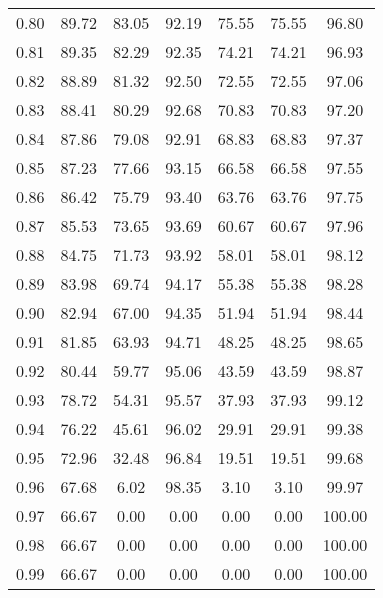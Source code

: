 \begin{tabular}{|c|c|c|c|c|c|c|}
      0.80 &     89.72 &     83.05 &      92.19 &   75.55 &      75.55 &         96.80 \\
      0.81 &     89.35 &     82.29 &      92.35 &   74.21 &      74.21 &         96.93 \\
      0.82 &     88.89 &     81.32 &      92.50 &   72.55 &      72.55 &         97.06 \\
      0.83 &     88.41 &     80.29 &      92.68 &   70.83 &      70.83 &         97.20 \\
      0.84 &     87.86 &     79.08 &      92.91 &   68.83 &      68.83 &         97.37 \\
      0.85 &     87.23 &     77.66 &      93.15 &   66.58 &      66.58 &         97.55 \\
      0.86 &     86.42 &     75.79 &      93.40 &   63.76 &      63.76 &         97.75 \\
      0.87 &     85.53 &     73.65 &      93.69 &   60.67 &      60.67 &         97.96 \\
      0.88 &     84.75 &     71.73 &      93.92 &   58.01 &      58.01 &         98.12 \\
      0.89 &     83.98 &     69.74 &      94.17 &   55.38 &      55.38 &         98.28 \\
      0.90 &     82.94 &     67.00 &      94.35 &   51.94 &      51.94 &         98.44 \\
      0.91 &     81.85 &     63.93 &      94.71 &   48.25 &      48.25 &         98.65 \\
      0.92 &     80.44 &     59.77 &      95.06 &   43.59 &      43.59 &         98.87 \\
      0.93 &     78.72 &     54.31 &      95.57 &   37.93 &      37.93 &         99.12 \\
      0.94 &     76.22 &     45.61 &      96.02 &   29.91 &      29.91 &         99.38 \\
      0.95 &     72.96 &     32.48 &      96.84 &   19.51 &      19.51 &         99.68 \\
      0.96 &     67.68 &      6.02 &      98.35 &    3.10 &       3.10 &         99.97 \\
      0.97 &     66.67 &      0.00 &       0.00 &    0.00 &       0.00 &        100.00 \\
      0.98 &     66.67 &      0.00 &       0.00 &    0.00 &       0.00 &        100.00 \\
      0.99 &     66.67 &      0.00 &       0.00 &    0.00 &       0.00 &        100.00 \\
\bottomrule
\end{tabular}
